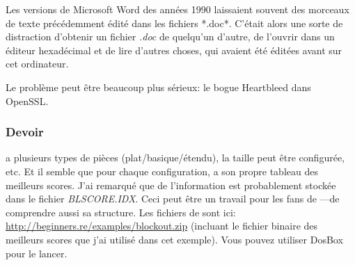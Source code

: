 Les versions de Microsoft Word des années 1990 laissaient souvent des morceaux de
texte précédemment édité dans les fichiers *.doc*.
C'était alors une sorte de distraction d'obtenir un fichier \emph{.doc} de quelqu'un
d'autre, de l'ouvrir dans un éditeur hexadécimal et de lire d'autres choses, qui
avaient été éditées avant sur cet ordinateur.

Le problème peut être beaucoup plus sérieux: le bogue Heartbleed
dans OpenSSL.

\subsubsection{Devoir}

 a plusieurs types de pièces (plat/basique/étendu), la taille peut être configurée, etc.
Et il semble que pour chaque configuration,  a son propre tableau des
meilleurs scores.
J'ai remarqué que de l'information est probablement stockée dans le fichier \emph{BLSCORE.IDX}.
Ceci peut être un travail pour les fans de ---de comprendre aussi sa
structure.
Les fichiers de  sont ici: \url{http://beginners.re/examples/blockout.zip}
(incluant le fichier binaire des meilleurs scores que j'ai utilisé dans cet exemple).
Vous pouvez utiliser DosBox pour le lancer.

